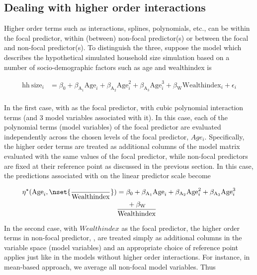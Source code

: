 \subsection{Dealing with higher order interactions}

Higher order terms such as interactions, splines, polynomials, etc., can be within the focal predictor, within (between) non-focal predictor(s) or between the focal and non-focal predictor(s). To distinguish the three, suppose the model which describes the hypothetical simulated household size simulation based on a number of socio-demographic factors such as age and wealthindex is

\begin{align}\label{sim:lm_cubic}
\mathrm{hh~size}_i &= \beta_0 + \beta_{\mathrm{A_1}}\mathrm{Age}_i + \beta_{\mathrm{A_2}}\mathrm{Age}^2_i + \beta_{\mathrm{A_3}}\mathrm{Age}^3_i + \beta_{\mathrm{W}}\mathrm{Wealthindex}_i + \epsilon_i \nonumber\\
\end{align}

In the first case, with  as the focal predictor, with cubic polynomial interaction terms (and 3 model variables associated with it). In this case, each of the polynomial terms (model variables) of the focal predictor are evaluated independently across the chosen levels of the focal predictor, $Age_i$. Specifically, the higher order terms are treated as additional columns of the model matrix evaluated with the same values of the focal predictor, while non-focal predictors are fixed at their reference point as discussed in the previous section. In this case, the predictions associated with  on the linear predictor scale become

\begin{align*}
\eta^\star(\mathrm{Age}_i, \nset{{\over{\mathrm{Wealthindex}}}}) &= \beta_0 + \beta_{\mathrm{A_1}}\mathrm{Age}_i + \beta_{\mathrm{A_2}}\mathrm{Age}^2_i + \beta_{\mathrm{A_3}}\mathrm{Age}^3_i\\
	& + \beta_{\mathrm{W}}\over{\mathrm{Wealthindex}}
\end{align*}

In the second case, with $Wealthindex$ as the focal predictor, the higher order terms in non-focal predictor, , are treated simply as additional columns in the variable space (model variables) and an appropriate choice of reference point applies just like in the models without higher order interactions. For instance, in mean-based approach, we average all non-focal model variables. Thus

